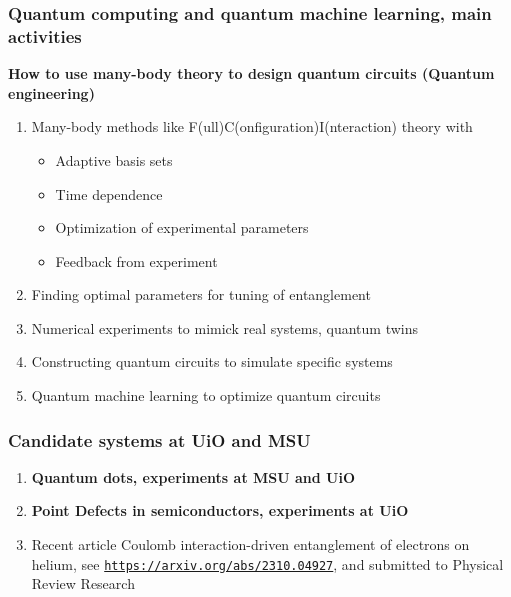 \documentclass{beamer}
\begin{document}
\begin{frame}
\frametitle{Quantum computing and quantum machine learning, main activities}

\textbf{How to use many-body theory to design quantum circuits (Quantum engineering)}
\begin{enumerate}
\item Many-body methods like F(ull)C(onfiguration)I(nteraction) theory  with
\begin{itemize}

  \item Adaptive basis sets 

  \item Time dependence

  \item Optimization of experimental parameters 

  \item Feedback from experiment

\end{itemize}

\noindent
\item Finding optimal parameters for tuning of entanglement 

\item Numerical experiments to mimick real systems, quantum twins

\item Constructing quantum circuits to simulate specific systems

\item Quantum machine learning to optimize quantum circuits
\end{enumerate}

\noindent
\end{frame}

\begin{frame}
\frametitle{Candidate systems at UiO and MSU}

\begin{block}{}
\begin{enumerate}
\item \textbf{Quantum dots, experiments at MSU and UiO}

\item \textbf{Point Defects in semiconductors, experiments at UiO}

\item Recent article Coulomb interaction-driven entanglement of electrons on helium, see \href{{https://arxiv.org/abs/2310.04927}}{\nolinkurl{https://arxiv.org/abs/2310.04927}}, and submitted to Physical Review Research
\end{enumerate}

\noindent
\end{block}
\end{frame}
\end{document}
